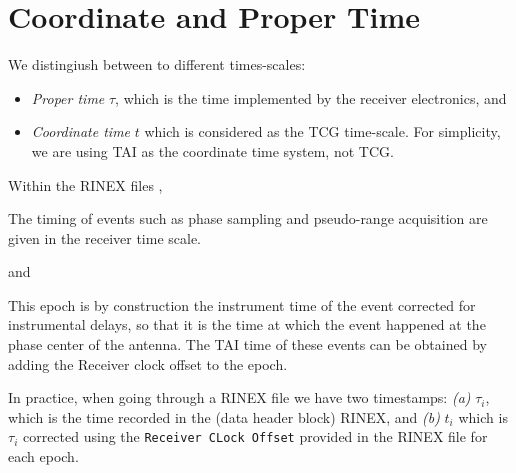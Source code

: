 \section{Coordinate and Proper Time}
\label{sec:coordinate-and-proper-time}
We distingiush between to different times-scales:
\begin{itemize}
  \item \emph{Proper time} $\tau$, which is the time implemented by the receiver 
    electronics, and
  \item \emph{Coordinate time} $t$ which is considered as the TCG time-scale.
  {\color{brown}For simplicity, we are using TAI as the coordinate time system, not TCG.}
\end{itemize}

Within the RINEX files \cite{DORISRNX3},
\begin{displayquote}
  The timing of events such as phase sampling and pseudo-range acquisition are 
  given in the receiver time scale.
\end{displayquote}
and
\begin{displayquote}
  This epoch is by construction the instrument time of the event corrected for 
  instrumental delays, so that it is the time at which the event happened at the 
  phase center of the antenna.
  The TAI time of these events can be obtained by adding the Receiver clock 
  offset to the epoch.
\end{displayquote}

In practice, when going through a RINEX file we have two timestamps: 
\textit{(a)} $\tau _i$, which is the time recorded in the (data header block) 
RINEX, and \textit{(b)} $t_i$ which is $\tau _i$ corrected using the 
\texttt{Receiver CLock Offset} provided in the RINEX file for each epoch.



